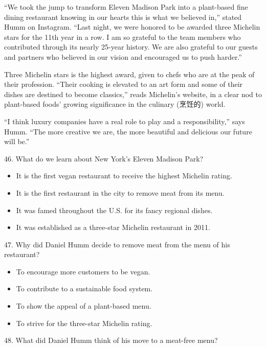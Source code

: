 \documentclass[UTF8,11pt]{ctexart}
\begin{document}
“We took the jump to transform Eleven Madison Park into a plant-based fine dining restaurant knowing in our hearts this is what we believed in,” stated Humm on Instagram. “Last night, we were honored to be awarded three Michelin stars for the 11th year in a row. I am so grateful to the team members who contributed through its nearly 25-year history. We are also grateful to our guests and partners who believed in our vision and encouraged us to push harder.”


Three Michelin stars is the highest award, given to chefs who are at the peak of their profession. “Their cooking is elevated to an art form and some of their dishes are destined to become classics,” reads Michelin’s website, in a clear nod to plant-based foods’ growing significance in the culinary (烹饪的) world.


“I think luxury companies have a real role to play and a responsibility,” says Humm. “The more creative we are, the more beautiful and delicious our future will be.”


46. What do we learn about New York’s Eleven Madison Park?


\begin{itemize}[leftmargin=2em,itemsep=.2em,topsep=.4em]\item[A.] It is the first vegan restaurant to receive the highest Michelin rating.
\item[B.] It is the first restaurant in the city to remove meat from its menu.
\item[C.] It was famed throughout the U.S. for its fancy regional dishes.
\item[D.] It was established as a three-star Michelin restaurant in 2011.
\end{itemize}

47. Why did Daniel Humm decide to remove meat from the menu of his restaurant?


\begin{itemize}[leftmargin=2em,itemsep=.2em,topsep=.4em]\item[A.] To encourage more customers to be vegan.
\item[B.] To contribute to a sustainable food system.
\item[C.] To show the appeal of a plant-based menu.
\item[D.] To strive for the three-star Michelin rating.
\end{itemize}

48. What did Daniel Humm think of his move to a meat-free menu?
\end{document}
